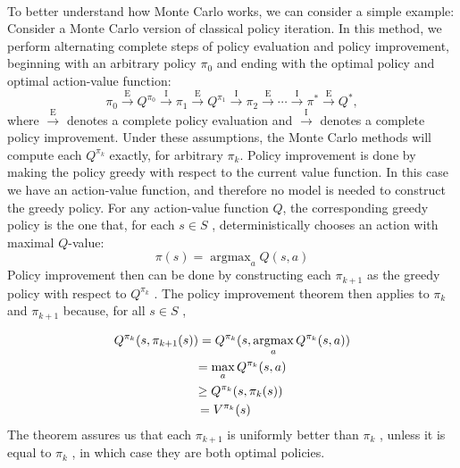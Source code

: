 \documentclass[11pt]{article}
\theoremstyle{plain}
\theoremstyle{definition}
\DeclareMathOperator*{\argmax}{argmax}
\begin{document}
\\
To better understand how Monte Carlo works, we can consider a simple example:
\\
Consider a Monte Carlo version of classical policy iteration. In this method, we perform alternating complete steps of policy evaluation and policy improvement, beginning with an arbitrary policy $\pi_0$ and ending with the optimal policy and optimal action-value function:
\begin{equation}
\pi_0\xrightarrow{\text{E}}Q^{\pi_0}\xrightarrow{\text{I}}\pi_1\xrightarrow{\text{E}}Q^{\pi_1}\xrightarrow{\text{I}}\pi_2\xrightarrow{\text{E}}\cdots\xrightarrow{\text{I}}\pi^*\xrightarrow{\text{E}}Q^{*},
\end{equation}
where $\xrightarrow{\text{E}}$ denotes a complete policy evaluation and $\xrightarrow{\text{I}}$ denotes a complete policy improvement.
\newpage
Under these assumptions, the Monte Carlo methods will compute each $Q^{\pi_k}$ exactly, for arbitrary ${\pi_k}$.
Policy improvement is done by making the policy greedy with respect to the current value function. In this case we have an action-value function, and therefore no model is needed to construct the greedy policy. For any action-value function $Q$, the corresponding greedy policy is the one that, for each $s \in S$ , deterministically chooses an action with maximal $Q$-value: 
\begin{equation}
\pi(s)=\argmax_a Q(s,a)
\end{equation}
Policy improvement then can be done by constructing each $\pi_{k+1}$ as the greedy policy with respect to $Q^{\pi_k}$ . The policy improvement theorem then applies  to $\pi_k$  and $\pi_{k+1}$ because, for all $s \in S$ , 

\begin{equation}
\begin{split}
Q^{\pi_k}(s, \pi_{k+1}(s))=Q^{\pi_k}(s, \argmax_a Q^{\pi_k}(s,a)) \\
= \max_a Q^{\pi_k}(s,a) \hspace{1.8cm} \\
\geq Q^{\pi_k}(s,\pi_k (s)) \hspace{1.9cm} \\
= V^{\pi_k} (s) \hspace{2.8cm}
\end{split}
\end{equation}
The theorem assures us that each $\pi_{k+1}$ is uniformly better than $\pi_k$ , unless it is equal to $\pi_k$ , in which case they are both optimal policies.
\end{document}
